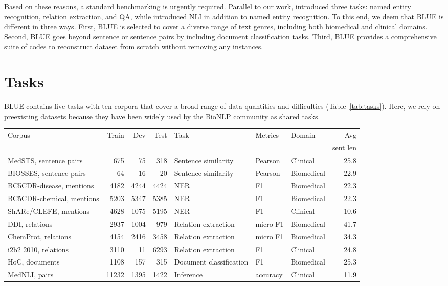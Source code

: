 \documentclass[11pt,a4paper]{article}
\begin{document}
Based on these reasons, a standard benchmarking is urgently required. Parallel to our work, \citet{lee2019biobert} introduced three tasks: named entity recognition, relation extraction, and QA, while \citet{jin2019probing} introduced NLI in addition to named entity recognition. To this end, we deem that BLUE is different in three ways. First, BLUE is selected to cover a diverse range of text genres, including both biomedical and clinical domains.  Second, BLUE goes beyond sentence or sentence pairs by including document classification tasks. Third, BLUE provides a comprehensive suite of codes to reconstruct dataset from scratch without removing any instances.

\section{Tasks}

BLUE contains five tasks with ten corpora that cover a broad range of data quantities and difficulties (Table~\ref{tab:tasks}). Here, we rely on preexisting datasets because they have been widely used by the BioNLP community as shared tasks.

\begin{table*}[!ht]
\centering
\small
\begin{tabular}{lrrrlllr}
\toprule
Corpus & Train & Dev & Test & Task & Metrics & Domain & Avg \\
&&&&&&&sent len\\
\midrule
MedSTS, sentence pairs & 675 & 75 & 318 & Sentence similarity & Pearson  & Clinical & 25.8\\
BIOSSES, sentence pairs & 64 & 16 & 20 & Sentence similarity & Pearson  & Biomedical & 22.9\\
BC5CDR-disease, mentions & 4182 & 4244 & 4424 & NER & F1 & Biomedical & 22.3\\
BC5CDR-chemical, mentions & 5203 & 5347 & 5385 & NER & F1 & Biomedical & 22.3\\
ShARe/CLEFE, mentions & 4628 & 1075 & 5195  & NER & F1 & Clinical & 10.6\\
DDI, relations & 2937 & 1004 & 979 & Relation extraction & micro F1 & Biomedical & 41.7\\
ChemProt, relations & 4154  & 2416 & 3458 & Relation extraction & micro F1 & Biomedical & 34.3\\
i2b2 2010, relations & 3110 & 11 & 6293 & Relation extraction & F1 & Clinical & 24.8\\
HoC, documents & 1108 & 157 & 315 & Document classification & F1 & Biomedical & 25.3\\
MedNLI, pairs & 11232 & 1395 & 1422 & Inference & accuracy & Clinical & 11.9\\
\bottomrule
\end{tabular}
\caption{BLUE tasks}
\label{tab:tasks}
\end{table*}
\end{document}
